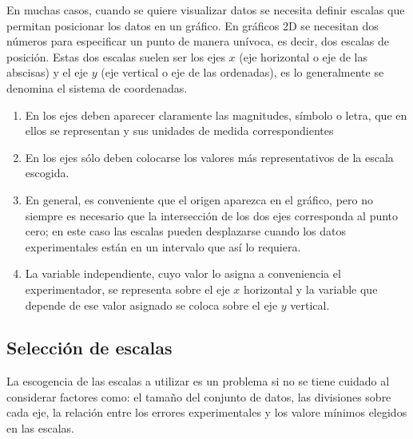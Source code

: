 En muchas casos, cuando se quiere visualizar datos se necesita definir escalas que permitan posicionar los datos en un gr\'afico. En gr\'aficos 2D se necesitan dos n\'umeros para especificar un punto de manera un\'ivoca, es decir, dos escalas de posici\'on. Estas dos escalas suelen ser los ejes $x$ (eje horizontal o eje de las abscisas) y el eje $y$ (eje vertical o eje de las ordenadas), es lo generalmente  se denomina el sistema de coordenadas.

\begin{enumerate}
\item En los ejes deben aparecer claramente las magnitudes, s\'imbolo o letra, que en ellos se representan y sus unidades de medida correspondientes

\item En los ejes s\'olo deben colocarse los valores m\'as representativos de la escala escogida.

\item En general, es conveniente que el origen aparezca en el gr\'afico, pero no siempre es necesario que la intersecci\'on de los dos ejes corresponda al punto cero; en este caso las escalas pueden desplazarse cuando los datos experimentales est\'an en un intervalo que as\'i lo requiera.

\item La variable independiente, cuyo valor lo asigna a conveniencia el experimentador, se representa sobre el eje $x$ horizontal y la variable que depende de ese valor asignado se coloca sobre el eje $y$ vertical.
\end{enumerate}


\subsection{Selecci\'on de escalas}
La escogencia de las escalas a utilizar es un problema si no se tiene cuidado al considerar factores como: el tama\~no del conjunto de datos, las divisiones sobre cada eje, la relaci\'on entre los errores experimentales y los valore m\'inimos elegidos en las escalas. 

